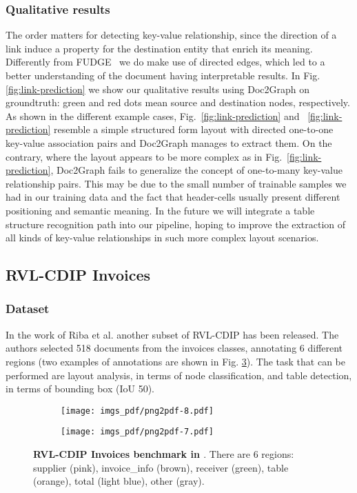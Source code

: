 \documentclass[runningheads]{llncs}
\begin{document}
\subsubsection{Qualitative results}
The order matters for detecting key-value relationship, since the direction of a link induce a property for the destination entity that enrich its meaning. Differently from FUDGE~\cite{davis2021visual} we do make use of directed edges, which led to a better understanding of the document having interpretable results. In Fig. \ref{fig:link-prediction} we show our qualitative results using Doc2Graph on groundtruth: green and red dots mean source and destination nodes, respectively. As shown in the different example cases, Fig.~\ref{fig:link-prediction} and ~\ref{fig:link-prediction} resemble a simple structured form layout with directed one-to-one key-value association pairs and Doc2Graph manages to extract them. On the contrary, where the layout appears to be more complex as in Fig.~\ref{fig:link-prediction}, Doc2Graph fails to generalize the concept of one-to-many key-value relationship pairs. This may be due to the small number of trainable samples we had in our training data and the fact that header-cells usually present different positioning and semantic meaning. In the future we will integrate a table structure recognition path into our pipeline, hoping to improve the extraction of all kinds of key-value relationships in such more complex layout scenarios.

\subsection{RVL-CDIP Invoices}
\subsubsection{Dataset} In the work of Riba et al. \cite{riba2019table} another subset of RVL-CDIP has been released. The authors selected 518 documents from the invoices classes, annotating 6 different regions (two examples of annotations are shown in Fig. \ref{fig:invoices}). The task that can be performed are layout analysis, in terms of node classification, and table detection, in terms of bounding box (IoU  50). 

\begin{figure}
     \centering
     \begin{subfigure}[b]{0.4\textwidth}
         \centering
         \texttt{[image: imgs\_pdf/png2pdf-8.pdf]}
         \label{fig:pa}
     \end{subfigure}
     \begin{subfigure}[b]{0.4\textwidth}
         \centering
         \texttt{[image: imgs\_pdf/png2pdf-7.pdf]}
         \label{fig:three sin x}
     \end{subfigure}
     \caption{\textbf{RVL-CDIP Invoices benchmark in \cite{riba2019table}}. There are 6 regions: supplier (pink), invoice\_info (brown), receiver (green), table (orange), total (light blue), other (gray).}
     \label{fig:invoices}
\end{figure}
\end{document}
